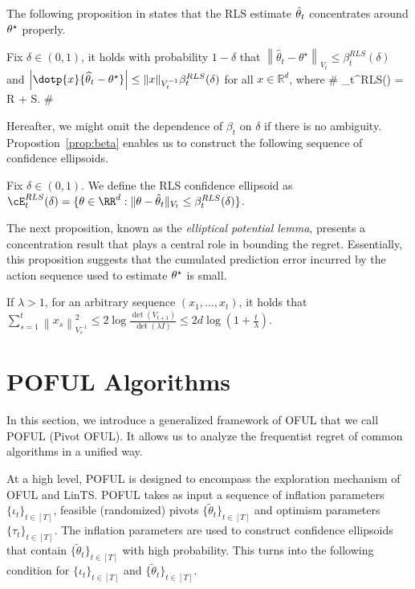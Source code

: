 The following proposition in \cite{abbasi2011improved} states that the RLS estimate $\hat{\theta}_t$  concentrates around $\theta^\star$ properly.
\begin{proposition}
	\label{prop:beta}
	Fix $\delta  \in (0,1)$, it holds with probability $1-\delta$ that
	$
	\left\|\widehat{\theta}_t-\theta^{\star}\right\|_{V_t} \leq \beta_t^{RLS}(\delta)$ and $\left|\dotp{x}{\widehat{\theta}_t-\theta^{\star}}\right| \leq\|x\|_{V_t^{-1}} \beta_t^{RLS}(\delta)
	$
	for all $x\in \mathbb{R}^d$,   where
	\#
	\beta_t^{RLS}(\delta) = R +\sqrt{\lambda} S.
	\#
\end{proposition}
Hereafter, we might omit the dependence of $\beta_t$ on $\delta$ if there is no ambiguity. Propostion~\ref{prop:beta} enables us to construct the following sequence of confidence ellipsoids.
\begin{definition}
	\label{def:rls}
	Fix $\delta\in (0,1)$. We define the RLS confidence ellipsoid as	$
	\cE_t^{RLS}(\delta)  = \{\theta \in \RR^d: \|\theta - \hparam_t\|_{V_t}\leq \beta_t^{RLS}(\delta) \}$.
\end{definition}


The next proposition, known as the \emph{elliptical potential lemma}, presents a concentration result that plays a central role in bounding the regret. Essentially, this proposition suggests that the cumulated prediction error incurred by the action sequence used to estimate $\theta^\star$ is small.
\begin{proposition} \label{prop:potential}
	If $\lambda >1$, for an arbitrary sequence $(x_1,\dots,x_t)$, it holds that
	$
	\sum_{s=1}^t\left\|x_s\right\|_{V_s^{-1}}^2 \leq 2 \log \frac{\operatorname{det}\left(V_{t+1}\right)}{\operatorname{det}(\lambda I)} \leq 2 d \log \left(1+\frac{t}{\lambda}\right).
	$

\end{proposition}


\section{POFUL Algorithms}
\label{sec:POFUL}
In this section, we introduce a generalized framework of OFUL that we call POFUL (Pivot OFUL). It allows us to analyze the frequentist regret of common algorithms in a unified way. 

At a high level, POFUL is designed to encompass the exploration mechanism of OFUL and LinTS. POFUL takes as input a sequence of inflation parameters $\{\iota_t\}_{t\in [T]}$,  feasible (randomized) pivots $\{\tilde{\theta}_t\}_{t\in[T]}$ and optimism parameters $\{\tau_t\}_{t\in [T]}$. The inflation parameters are used to construct confidence ellipsoids that contain $\{\tilde{\theta}_t\}_{t\in[T]}$ with high probability. This turns into the following condition for $\{\iota_t\}_{t\in [T]}$ and $\{\tilde{\theta}_t\}_{t\in[T]}$.

